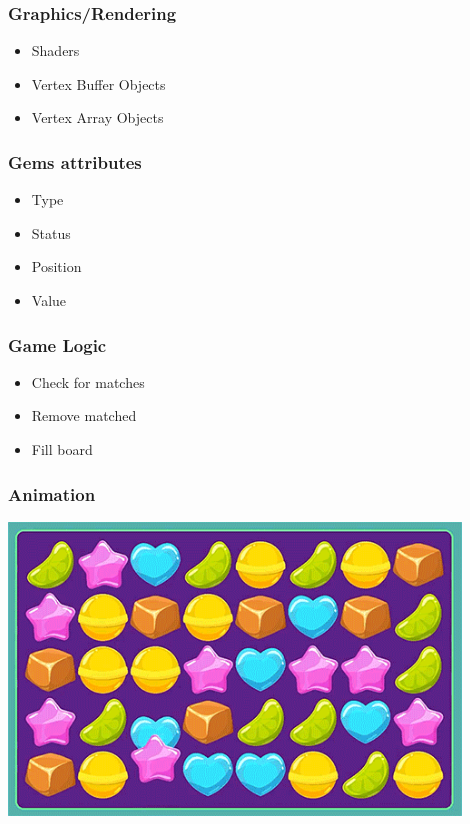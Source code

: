 \documentclass{beamer}
\begin{document}
    \begin{frame}
        \frametitle{Graphics/Rendering}
        \begin{itemize}
            \item Shaders
            \item Vertex Buffer Objects
            \item Vertex Array Objects
        \end{itemize}
    \end{frame}

    \begin{frame}
        \frametitle{Gems attributes}
        \begin{itemize}
            \item Type
            \item Status 
            \item Position
            \item Value
        \end{itemize}
    \end{frame}

    \begin{frame}
        \frametitle{Game Logic}
        \begin{itemize}
            \item Check for matches
            \item Remove matched
            \item Fill board
        \end{itemize}
    \end{frame}

    \begin{frame}
        \frametitle{Animation}
        \includegraphics[width=0.9\textwidth]{swap.png}
    \end{frame}
\end{document}
